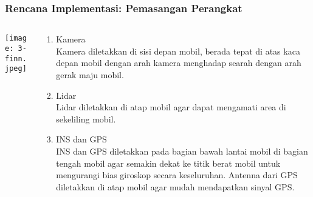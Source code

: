 \begin{frame}
    \frametitle{Rencana Implementasi: Pemasangan Perangkat}
    \begin{columns}
        \begin{column}{0.3\textwidth}
            \begin{center}
                \texttt{[image: 3-finn.jpeg]}
            \end{center}
        \end{column}
        \begin{column}{0.65\textwidth}
            \begin{enumerate}
                \item Kamera \\
                Kamera diletakkan di sisi depan mobil, berada tepat di atas kaca depan mobil dengan arah kamera menghadap searah dengan arah gerak maju mobil.

                \item Lidar \\
                Lidar diletakkan di atap mobil agar dapat mengamati area di sekeliling mobil.

                \item INS dan GPS \\
                INS dan GPS diletakkan pada bagian bawah lantai mobil di bagian tengah mobil agar semakin dekat ke titik berat mobil untuk mengurangi bias giroskop secara keseluruhan. Antenna dari GPS diletakkan di atap mobil agar mudah mendapatkan sinyal GPS.
            \end{enumerate}
        \end{column}
    \end{columns}
\end{frame}



